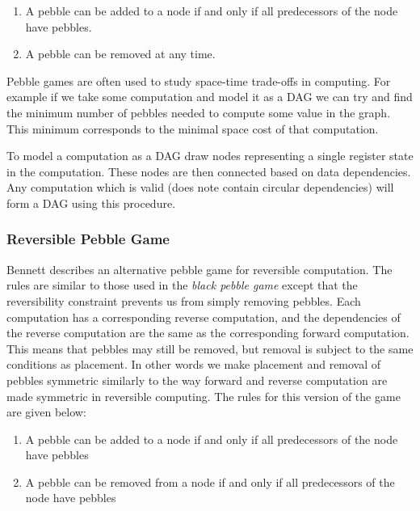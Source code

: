 \begin{enumerate}
  \item A pebble can be added to a node if and only if all predecessors of the
    node have pebbles.
  \item A pebble can be removed at any time.
\end{enumerate}

Pebble games are often used to study space-time trade-offs in computing. For
example if we take some computation and model it as a DAG we can try and find
the minimum number of pebbles needed to compute some value in the graph. This
minimum corresponds to the minimal space cost of that computation.

To model a computation as a DAG draw nodes representing a single register state
in the computation.  These nodes are then connected based on data dependencies.
Any computation which is valid (does note contain circular dependencies) will
form a DAG using this procedure.

\subsubsection{Reversible Pebble Game}

Bennett\cite{Bennett:89} describes an alternative pebble game for reversible
computation. The rules are similar to those used in the \emph{black pebble
game} except that the reversibility constraint prevents us from simply removing
pebbles. Each computation has a corresponding reverse computation, and the
dependencies of the reverse computation are the same as the corresponding
forward computation. This means that pebbles may still be removed, but removal
is subject to the same conditions as placement. In other words we make
placement and removal of pebbles symmetric similarly to the way forward and
reverse computation are made symmetric in reversible computing.  The rules for
this version of the game are given below:

\begin{enumerate}

  \item A pebble can be added to a node if and only if all predecessors of the
    node have pebbles

  \item A pebble can be removed from a node if and only if all predecessors of
    the node have pebbles

\end{enumerate}

